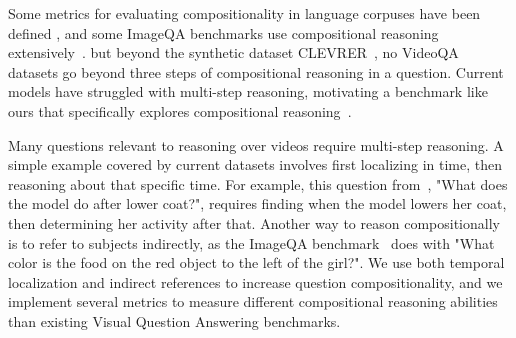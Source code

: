 Some metrics for evaluating compositionality in language corpuses have been defined \cite{keysers2019measuring,lake2018generalization}, and some ImageQA benchmarks use compositional reasoning extensively~\cite{johnson2017clevr,hudson2019gqa}. but beyond the synthetic dataset CLEVRER~\cite{yi2019clevrer}, no VideoQA datasets go beyond three steps of compositional reasoning in a question. 
Current models have struggled with multi-step reasoning, motivating a benchmark like ours that specifically explores compositional reasoning~\cite{fan2019heterogeneous}.


Many questions relevant to reasoning over videos require multi-step reasoning. A simple example covered by current datasets involves first localizing in time, then reasoning about that specific time. For example, this question from~\cite{jang2017tgif}, "What does the model do after
lower coat?", requires finding when the model lowers her coat, then determining her activity after that. Another way to reason compositionally  is to refer to subjects indirectly, as the ImageQA benchmark~\cite{hudson2019gqa} does with "What color is the food on the red object to the left of the girl?". We use both temporal localization and indirect references to increase question compositionality, and we implement several metrics to measure different compositional reasoning abilities than existing Visual Question Answering benchmarks.



